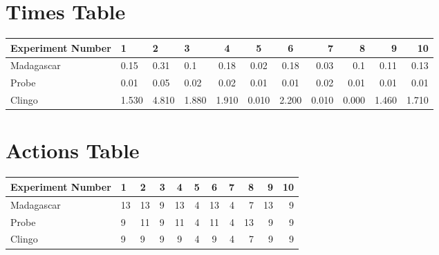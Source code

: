 \documentclass[8pt]{article}
\begin{document}
\begin{landscape}
\section{Times Table}\begin{tabular}{ | l | l | l | l | c | c | c | r | r | r | r | }\hline
Experiment Number & 1 & 2 & 3 & 4 & 5 & 6 & 7 & 8 & 9 & 10\\  \hline
Madagascar & 0.15 & 0.31 & 0.1 & 0.18 & 0.02 & 0.18 & 0.03 & 0.1 & 0.11 & 0.13\\  \hline
Probe & 0.01 & 0.05 & 0.02 & 0.02 & 0.01 & 0.01 & 0.02 & 0.01 & 0.01 & 0.01\\  \hline
Clingo & 1.530 & 4.810 & 1.880 & 1.910 & 0.010 & 2.200 & 0.010 & 0.000 & 1.460 & 1.710\\  \hline
\end{tabular}
\section{Actions Table}\begin{tabular}{ | l | l | l | l | c | c | c | r | r | r | r | }\hline
Experiment Number & 1 & 2 & 3 & 4 & 5 & 6 & 7 & 8 & 9 & 10\\ \hline
 Madagascar & 13 & 13 & 9 & 13 & 4 & 13 & 4 & 7 & 13 & 9\\ \hline
 Probe & 9 & 11 & 9 & 11 & 4 & 11 & 4 & 13 & 9 & 9\\ \hline
 Clingo & 9 & 9 & 9 & 9 & 4 & 9 & 4 & 7 & 9 & 9\\ \hline
\end{tabular}
\end{landscape}
\end{document}
